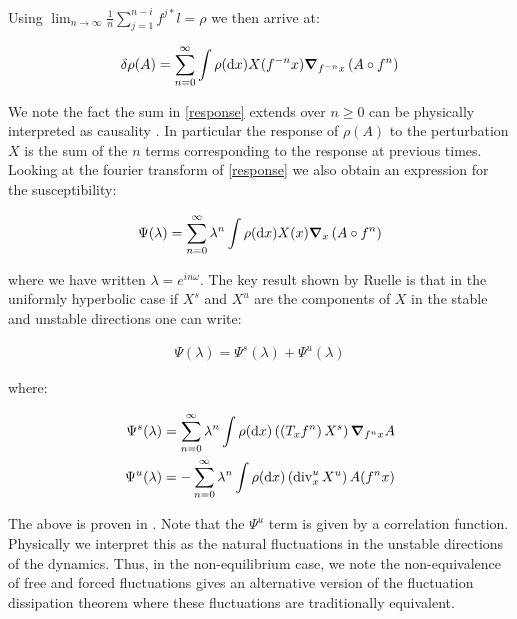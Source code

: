 \noindent Using $\lim_{n \to \infty} \frac{1}{n} \sum_{j=1}^{n-i} f^{j*} l = \rho$ we then arrive at:

\begin{align}
\delta \rho (A) = \sum_{n =0}^\infty \int \rho (\dd x) X(f^{-n}x) \grad_{f^{-n}x}\left(A \circ f^n \right) \label{response}
\end{align}

\noindent We note the fact the sum in \ref{response} extends over $n \geq 0$ can be physically interpreted as causality \cite{Ruelle}. In particular the response of $\rho(A)$ to the perturbation $X$ is the sum of the $n$ terms corresponding to the response at previous times. Looking at the fourier transform of \ref{response} we also obtain an expression for the susceptibility:

\begin{align}
\Psi(\lambda) = \sum_{n=0}^\infty \lambda ^n \int \rho (\dd x) X(x) \grad_x \left(A \circ f^n \right)
\end{align}

\noindent where we have written $\lambda = e^{in\omega}$. The key result shown by Ruelle is that in the uniformly hyperbolic case if $X^s$ and $X^u$ are the components of $X$ in  the stable and unstable directions one can write:

\begin{align} \label{Response Geometry}
\Psi(\lambda) = \Psi ^s(\lambda) + \Psi ^u (\lambda)
\end{align}

\noindent where:

\begin{align}
\Psi^s(\lambda) &= \sum_{n=0}^\infty \lambda^n \int \rho(\dd x) \left( \left(T_x f^n \right) X^s \right) \grad_{f^n x} A \\
\Psi^u(\lambda) &= - \sum_{n=0}^\infty \lambda^n \int \rho(\dd x) \left( \operatorname{div}_x^u X^u \right) A(f^n x)
\end{align}

\noindent The above is proven in \cite{Ruelle1997}. Note that the $\Psi^u$ term is given by a correlation function. Physically we interpret this as the natural fluctuations in the unstable directions of the dynamics. Thus, in the non-equilibrium case, we note the non-equivalence of free and forced fluctuations gives an alternative version of the fluctuation dissipation theorem where these fluctuations are traditionally equivalent.
